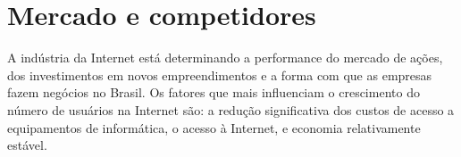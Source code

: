 \chapter{Mercado e competidores}
\label{chapter: Mercado e competidores}

\begin{commentA} \vspace{0.3cm} \noindent * \par \vspace{0.1cm} \end{commentA}

A indústria da Internet está determinando a performance do mercado de ações, dos investimentos em novos empreendimentos e a forma com que as empresas fazem negócios no Brasil. Os fatores que mais influenciam o crescimento do número de usuários na Internet são: a redução significativa dos custos de acesso a equipamentos de informática, o acesso à Internet, e economia relativamente estável.\par
